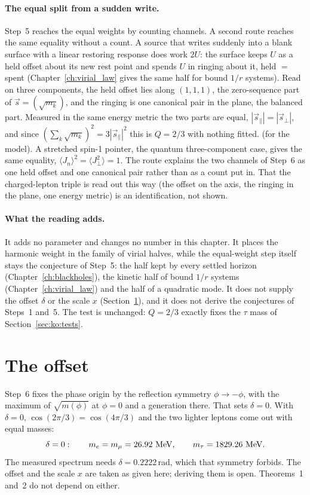 \paragraph{The equal split from a sudden write.} Step~5 reaches the equal weights by counting channels. A second route reaches the same
equality without a count. A source that writes suddenly into a blank surface with a linear restoring response does work $2U$: the surface keeps
$U$ as a held offset about its new rest point and spends $U$ in ringing about it, held $=$ spent (Chapter~\ref{ch:virial_law} gives the same half
for bound $1/r$ systems). \derived{} Read on three components, the held offset lies along $(1,1,1)$, the zero-sequence part of
$\vec s=(\sqrt{m_k})$, and the ringing is one canonical pair in the plane, the balanced part. Measured in the same energy metric the two parts
are equal, $|\vec s_\parallel|=|\vec s_\perp|$, and since $(\sum_k\sqrt{m_k})^2=3|\vec s_\parallel|^2$ this is $Q=2/3$ with nothing fitted.
\derived{} (for the model). A stretched spin-1 pointer, the quantum three-component case, gives the same equality,
$\langle J_n\rangle^2=\langle J_\perp^2\rangle=1$. \derived{} The route explains the two channels of Step~6 as one held offset and one
canonical pair rather than as a count put in. That the charged-lepton triple is read out this way (the offset on the axis, the ringing in the
plane, one energy metric) is an identification, not shown. \conjecture

\paragraph{What the reading adds.} It adds no parameter and changes no number in this chapter. It places the harmonic weight in the family of
virial halves, while the equal-weight step itself stays the conjecture of Step~5: the half kept by every settled horizon (Chapter~\ref{ch:blackholes}), the kinetic half of bound $1/r$ systems
(Chapter~\ref{ch:virial_law}) and the half of a quadratic mode. \interp{} It does not supply the offset $\delta$ or the scale $x$
(Section~\ref{sec:ko:offset}), and it does not derive the conjectures of Steps~1 and~5. The test is unchanged: $Q=2/3$ exactly fixes the $\tau$ mass
of Section~\ref{sec:ko:tests}. \prediction

\section{The offset}\label{sec:ko:offset}
Step~6 fixes the phase origin by the reflection symmetry $\phi\to-\phi$, with the maximum of $\sqrt{m(\phi)}$ at $\phi=0$ and a generation there.
That sets $\delta=0$. With $\delta=0$, $\cos(2\pi/3)=\cos(4\pi/3)$ and the two lighter leptons come out with equal masses:
\begin{equation}
\delta=0:\qquad m_e=m_\mu=26.92\ {\rm MeV},\qquad m_\tau=1829.26\ {\rm MeV}.\label{eq:ko:delta0}
\end{equation}
\calc{} The measured spectrum needs $\delta=0.2222$\,rad, which that symmetry forbids. The offset and the scale $x$ are taken as given here; deriving them is open. Theorems~1 and~2 do not depend on either. \openprob

